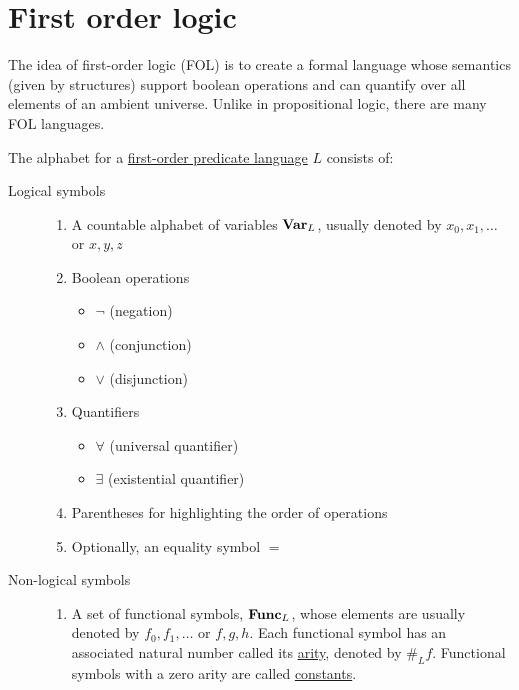 \section{First order logic}\label{sec:first_order_logic}

The idea of first-order logic (FOL) is to create a formal language whose semantics (given by structures) support boolean operations and can quantify over all elements of an ambient universe. Unlike in propositional logic, there are many FOL languages.

\begin{definition}\label{def:first_order_language}\cite[19]{Lectures:logic_programming}
  The alphabet for a \uline{first-order predicate language} $L$ consists of:
  \begin{description}
    \item[Logical symbols]
    \mbox{}
    \begin{enumerate}
      \item A countable alphabet of variables $\operatorname{\mathbf{Var}}_L$, usually denoted by $x_0, x_1, \ldots$ or $x, y, z$

      \item Boolean operations
      \begin{itemize}
        \item $\neg$ (negation)
        \item $\land$ (conjunction)
        \item $\lor$ (disjunction)
      \end{itemize}

      \item Quantifiers
      \begin{itemize}
        \item $\forall$ (universal quantifier)
        \item $\exists$ (existential quantifier)
      \end{itemize}

      \item Parentheses for highlighting the order of operations

      \item Optionally, an equality symbol $=$
    \end{enumerate}

    \item[Non-logical symbols]
    \mbox{}
    \begin{enumerate}
      \item A set of functional symbols, $\operatorname{\mathbf{Func}}_L$, whose elements are usually denoted by $f_0, f_1, \ldots$ or $f, g, h$. Each functional symbol has an associated natural number called its \uline{arity}, denoted by $\#_L f$. Functional symbols with a zero arity are called \uline{constants}.


\end{enumerate}
\end{description}
\end{definition}
